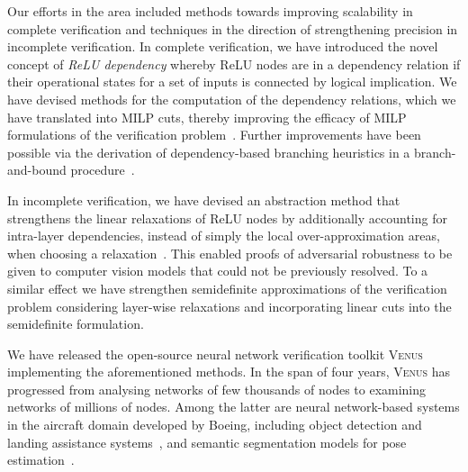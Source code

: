 \documentclass{article}
\newcommand{\venus}{\textsc{Venus}\xspace}
\begin{document}
Our efforts in the area included methods towards improving scalability in
complete verification and techniques in the direction of strengthening precision
in incomplete verification. In complete verification, we have introduced the
novel concept of {\em ReLU dependency} whereby ReLU nodes are in a dependency
relation if their operational states for a set of inputs is connected by logical
implication.  We have devised methods for the computation of the dependency
relations, which we  have translated into MILP cuts, thereby improving the
efficacy of MILP formulations of the verification problem~\cite{Botoeva+20}.
Further improvements have been possible via the derivation of dependency-based
branching heuristics  in a branch-and-bound procedure~\cite{KouvarosLomuscio21}.


In incomplete verification, we have devised an abstraction method that
strengthens the linear relaxations of ReLU nodes by additionally accounting for
intra-layer dependencies, instead of simply the local over-approximation areas,
when choosing a relaxation~\cite{HashemiKouvarosLomuscio21}. This enabled proofs
of adversarial robustness to be given to computer vision models that could not
be previously resolved. To a similar effect we have strengthen semidefinite
approximations of the verification problem  considering layer-wise relaxations
and incorporating linear cuts into the semidefinite formulation.

We have released the open-source neural network verification toolkit \venus
implementing the aforementioned methods.  In the span of four years, \venus has
progressed from analysing networks of few thousands of nodes to examining
networks of millions of nodes. Among the latter are neural network-based systems
in the aircraft domain developed by Boeing, including object detection and
landing assistance systems~\cite{Kouvaros+21}, and semantic segmentation models
for pose estimation~\cite{Kouvaros+23}.
\end{document}
